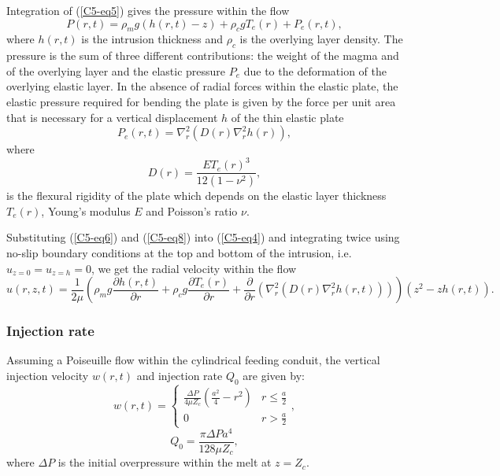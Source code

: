 Integration of (\ref{C5-eq5}) gives the pressure within the flow
\begin{equation}
  P(r,t)=\rho_{m}g(h(r,t)-z) + \rho_{c}gT_e(r) + P_{e}(r,t),
  \label{C5-eq6}
\end{equation}
where  $h(r,t)$  is  the  intrusion  thickness  and  $\rho_c$  is  the
overlying layer density.   The pressure is the sum  of three different
contributions: the weight of the magma  and of the overlying layer and
the elastic  pressure $P_e$  due to the  deformation of  the overlying
elastic  layer. In  the absence  of radial  forces within  the elastic
plate, the elastic pressure required for bending the plate is given by
the force per unit area that  is necessary for a vertical displacement
$h$ of the thin elastic plate \citep{Turcotte:1982ca}
\begin{equation}
  P_{e}(r,t)=\nabla^{2}_{r}\left( D(r)\nabla^{2}_{r}h(r) \right),
  \label{C5-eq8}	
\end{equation}
where
\begin{equation}
  D(r)=\frac{ET_e(r)^{3}}{12(1-\nu^2)},
  \label{C5-eq8a}
\end{equation}
is the  flexural rigidity of  the plate  which depends on  the elastic
layer thickness  $T_{e}(r)$, Young's  modulus $E$ and  Poisson's ratio
$\nu$.
	 	
Substituting (\ref{C5-eq6}) and (\ref{C5-eq8}) into (\ref{C5-eq4}) and
integrating twice  using no-slip  boundary conditions  at the  top and
bottom of the  intrusion, i.e. $u_{z=0}=u_{z=h}=0$, we  get the radial
velocity within the flow
\begin{equation}
  u(r,z,t)=        \frac{1}{2\mu}\left(\rho_{m}g        \frac{\partial
      h(r,t)}{\partial r} +  \rho_{c}g \frac{\partial T_e(r)}{\partial
      r}+\frac{\partial}{\partial                              r}\left
      (         \nabla^{2}_{r}(D(r)\nabla^{2}_{r}h(r,t))\right)\right)
  (z^{2}-zh(r,t)).

  \label{C5-eq10}
\end{equation}

\subsubsection{Injection rate}
\label{C5-Injection_Rate}

Assuming a Poiseuille flow within the cylindrical feeding conduit, the
vertical  injection velocity  $w(r,t)$  and injection  rate $Q_0$  are
given by:
\begin{equation*}
  w(r,t)=
  \begin{cases}
    \frac{ \Delta P}{4 \mu Z_{c}} (\frac{a^{2}}{4}-r^{2})& r \le \frac{a}{2}\\
    0 & r > \frac{a}{2}
  \end{cases},
  \label{C5-eq12}
\end{equation*}
\begin{equation}
  Q_{0}=\frac{\pi \Delta P a^{4}}{128 \mu Z_c},
  \label{C5-eq11}
\end{equation}
where  $\Delta P$  is  the  initial overpressure  within  the melt  at
$z=Z_{c}$.

